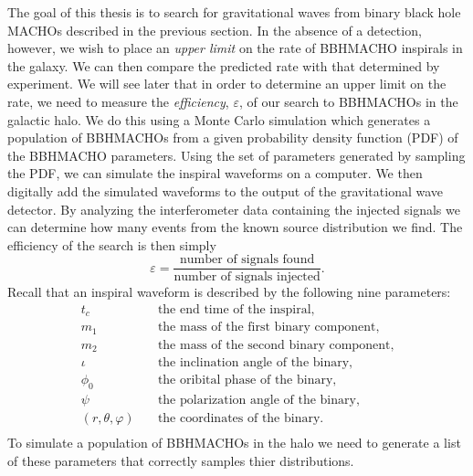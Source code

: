 The goal of this thesis is to search for gravitational waves from binary
black hole MACHOs described in the previous section. In the absence of a
detection, however, we wish to place an \emph{upper limit} on the rate of
BBHMACHO inspirals in the galaxy. We can then compare the predicted rate
with that determined by experiment. We will see later that in order to
determine an upper limit on the rate, we need to measure the \emph{efficiency},
$\varepsilon$, of our search to BBHMACHOs in the galactic halo. We do this
using a Monte Carlo simulation which generates a population of BBHMACHOs from
a given probability density function (PDF) of the BBHMACHO parameters. Using the
set of parameters generated by sampling the PDF, we can simulate the inspiral
waveforms on a computer. We then digitally add the simulated waveforms to the
output of the gravitational wave detector. By analyzing
the interferometer data containing the injected signals we can determine how
many events from the known source distribution we find. The efficiency of the
search is then simply
\begin{equation}
\varepsilon = 
\frac{\textrm{number of signals found}}{\textrm{number of signals injected}}.
\end{equation}
Recall that an inspiral waveform is described by the following nine 
parameters:
\begin{equation*}
\begin{split}
t_c &\quad \textrm{the end time of the inspiral}, \\
m_1 &\quad \textrm{the mass of the first binary component}, \\
m_2 &\quad \textrm{the mass of the second binary component}, \\
\iota &\quad \textrm{the inclination angle of the binary}, \\
\phi_0 &\quad \textrm{the oribital phase of the binary}, \\
\psi &\quad \textrm{the polarization angle of the binary}, \\
(r,\theta,\varphi) &\quad \textrm{the coordinates of the binary}.\\
\end{split}
\end{equation*}
To simulate a population of BBHMACHOs in the halo we need to generate a list
of these parameters that correctly samples thier distributions.

